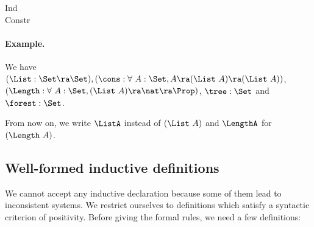 \begin{description}
\item[Ind]  
\item[Constr]  

\end{description}

\paragraph{Example.}
We have $(\List:\Set \ra \Set), (\cons:\forall~A:\Set,A\ra(\List~A)\ra
(\List~A))$, \\ 
$(\Length:\forall~A:\Set, (\List~A)\ra\nat\ra\Prop)$, $\tree:\Set$ and $\forest:\Set$.

From now on, we write $\ListA$ instead of $(\List~A)$ and $\LengthA$
for $(\Length~A)$.



\subsection{Well-formed inductive definitions}
We cannot accept any inductive declaration because some of them lead
to inconsistent systems. We restrict ourselves to definitions which
satisfy a syntactic criterion of positivity. Before giving the formal
rules, we need a few definitions:

